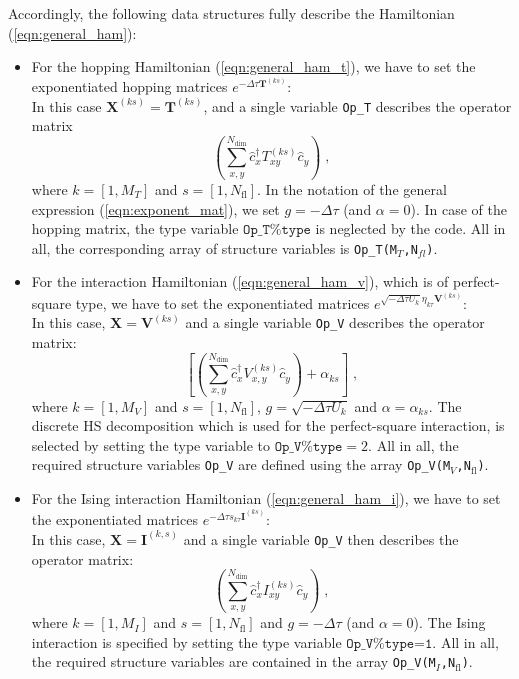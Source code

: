 Accordingly, the following data structures fully describe the  Hamiltonian (\ref{eqn:general_ham}):
\begin{itemize}
\item For the hopping Hamiltonian (\ref{eqn:general_ham_t}), we have to set the exponentiated hopping matrices $ e^{-\Delta \tau {\bm T}^{(ks)}}$: \\
In this case $\bm{X}^{(ks)}=\bm{T}^{(ks)}$, and a single variable  \texttt{Op\_T}  describes the operator matrix
\begin{equation}
            \left( \sum_{x,y}^{N_{\mathrm{dim}}} \hat{c}^{\dagger}_x T_{xy}^{(ks)} \hat{c}^{\phantom{\dagger}}_{y}  \right)  \;,
\end{equation} 
where $k=[1, M_{T}]$ and $s=[1, N_{\mathrm{fl}}]$. In the notation of the general expression (\ref{eqn:exponent_mat}), we set $g=-\Delta \tau$ (and $\alpha = 0$).
In case of the hopping matrix, the type variable $\texttt{Op\_T\%type}$  is neglected by the code. 
All in all, the corresponding array of structure variables is  \texttt{Op\_T(M$_T$,N$_{fl}$)}.

\item For the interaction Hamiltonian (\ref{eqn:general_ham_v}), which is of perfect-square type, we have to set the exponentiated matrices $e^{  \sqrt{ -  \Delta \tau  U_k} \eta_{k\tau} {\bm V}^{(ks)} }$:\\
In this case, $\bm{X}  = \bm{V}^{(ks)}$ and a single variable  \texttt{Op\_V}  describes the operator matrix:
\begin{equation}
             \left[ \left( \sum_{x,y}^{N_{\mathrm{dim}}} \hat{c}^{\dagger}_x V_{x,y}^{(ks)} \hat{c}^{\phantom{\dagger}}_{y}  \right)  + \alpha_{ks} \right]  \;,
\end{equation} 
where $k=[1, M_{V}]$ and $s=[1, N_{\mathrm{fl}}]$, $g = \sqrt{-\Delta \tau  U_k}$ and  $\alpha = \alpha_{ks}$. 
The discrete HS decomposition which is used for the perfect-square interaction, is selected by setting the type variable to $\texttt{Op\_V\%type}=2$.
All in all, the required structure variables \texttt{Op\_V} are defined  using the array \texttt{Op\_V(M$_V$,N$_\mathrm{fl}$)}.


\item For the Ising interaction Hamiltonian (\ref{eqn:general_ham_i}), we have to set the exponentiated matrices $e^{  -\Delta \tau s_{k\tau}  {\bm I}^{(ks)}}$:\\
In this case, $\bm{X}  = \bm{I}^{(k,s)} $ and a single variable  \texttt{Op\_V} then  describes the operator matrix:
\begin{equation}
            \left( \sum_{x,y}^{N_{\mathrm{dim}}} \hat{c}^{\dagger}_x I_{xy}^{(ks)} \hat{c}^{\phantom{\dagger}}_{y}  \right)  \;,
\end{equation} 
where $k=[1, M_{I}]$ and $s=[1, N_{\mathrm{fl}}]$ and $g = -\Delta \tau$ (and $\alpha = 0$).
The Ising interaction is specified by setting the type variable  $\texttt{Op\_V\%type=1}$. 
All in all, the required structure variables are contained in the array \texttt{Op\_V(M$_{I}$,N$_\mathrm{fl}$)}.


\end{itemize}
